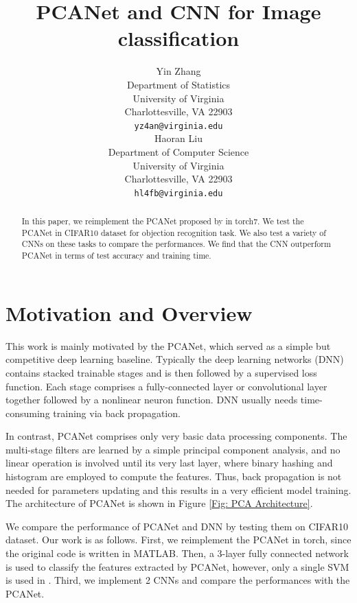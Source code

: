 \documentclass{article} %
\title{PCANet and CNN for Image classification}
\author{
Yin Zhang \\
Department of Statistics\\
University of Virginia\\
Charlottesville, VA 22903 \\
\texttt{yz4an@virginia.edu} \\
\And
Haoran Liu \\
Department of Computer Science \\
University of Virginia\\
Charlottesville, VA 22903  \\
\texttt{hl4fb@virginia.edu} \\
}
\begin{document}
\renewcommand{\b}[1] {\boldsymbol{#1}} 
\newcommand{\bb}[1] {\bar{\boldsymbol{#1}}}
\maketitle

\begin{abstract}

In this paper, we reimplement the PCANet proposed by \cite{chan2015pcanet} in torch7. We test the PCANet in CIFAR10 dataset for objection recognition task. We also test a variety of CNNs on these tasks to compare the performances. We find that the CNN outperform PCANet in terms of test accuracy and training time.
\end{abstract}

\section{Motivation and Overview}
This work is mainly motivated by the PCANet, which served as a simple but competitive deep learning baseline. Typically the deep learning networks (DNN) contains stacked trainable stages and is then followed by a supervised loss function. Each stage comprises a fully-connected layer or convolutional layer together followed by a nonlinear neuron function. DNN usually needs time-consuming training via back propagation.

In contrast, PCANet comprises only very basic data processing components. The multi-stage filters are learned by a simple principal component analysis, and no linear operation is involved until its very last layer, where binary hashing and histogram are employed to compute the features. Thus, back propagation is not needed for parameters updating and this results in a very efficient model training. The architecture of PCANet is shown in Figure \ref{Fig: PCA Architecture}.

We compare the performance of PCANet and DNN by testing them on CIFAR10 dataset. Our work is as follows. First, we reimplement the PCANet in torch, since the original code is written in MATLAB. Then, a 3-layer fully connected network is used to classify the features extracted by PCANet, however, only a single SVM is used in \cite{chan2015pcanet}. Third, we implement 2 CNNs and compare the performances with the PCANet. 
\end{document}
